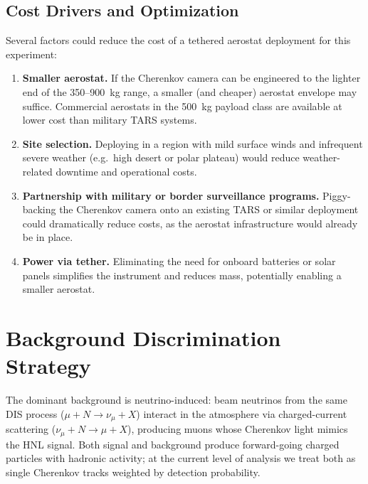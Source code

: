 \documentclass[11pt]{article}
\begin{document}
\subsection{Cost Drivers and Optimization}

Several factors could reduce the cost of a tethered aerostat deployment
for this experiment:

\begin{enumerate}[nosep]
  \item \textbf{Smaller aerostat.}  If the Cherenkov camera can be
        engineered to the lighter end of the 350--900~kg range, a
        smaller (and cheaper) aerostat envelope may suffice.
        Commercial aerostats in the 500~kg payload class are
        available at lower cost than military TARS systems.
  \item \textbf{Site selection.}  Deploying in a region with mild
        surface winds and infrequent severe weather (e.g.\ high desert
        or polar plateau) would reduce weather-related downtime and
        operational costs.
  \item \textbf{Partnership with military or border surveillance
        programs.}  Piggy-backing the Cherenkov camera onto an existing
        TARS or similar deployment could dramatically reduce costs,
        as the aerostat infrastructure would already be in place.
  \item \textbf{Power via tether.}  Eliminating the need for onboard
        batteries or solar panels simplifies the instrument and
        reduces mass, potentially enabling a smaller aerostat.
\end{enumerate}


\section{Background Discrimination Strategy}
\label{sec:discrimination}

The dominant background is neutrino-induced: beam neutrinos from the
same DIS process ($\mu + N \to \nu_\mu + X$) interact in the atmosphere
via charged-current scattering ($\nu_\mu + N \to \mu + X$), producing
muons whose Cherenkov light mimics the HNL signal.  Both signal and
background produce forward-going charged particles with hadronic
activity; at the current level of analysis we treat both as single
Cherenkov tracks weighted by detection probability.
\end{document}
